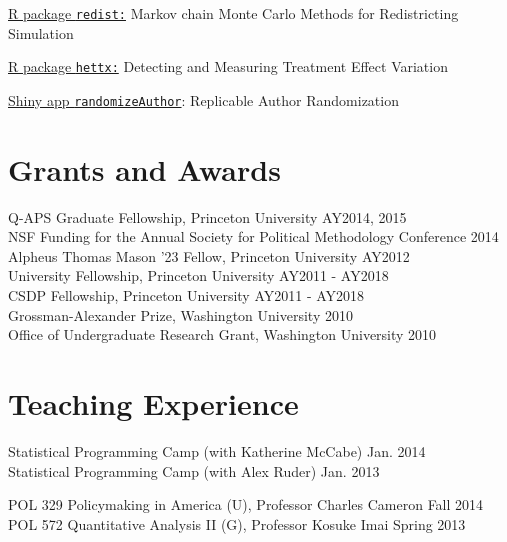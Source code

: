 \documentclass[]{deedy-resume-openfont}
\begin{document}
\href{https://github.com/kosukeimai/redist}{R package \texttt{redist:}} Markov chain Monte Carlo Methods for Redistricting Simulation\\\vspace{2mm}

\href{https://github.com/bfifield/hettx}{R package \texttt{hettx:}} Detecting and Measuring Treatment Effect Variation\\\vspace{2mm}

\href{https://randomizeauthor.shinyapps.io/shiny/}{Shiny app \texttt{randomizeAuthor}}: Replicable Author Randomization
\sectionsep

\section{Grants and Awards}
Q-APS Graduate Fellowship, Princeton University \hfill AY2014, 2015\\
NSF Funding for the Annual Society for Political Methodology Conference \hfill 2014\\
Alpheus Thomas Mason '23 Fellow, Princeton University \hfill AY2012\\
University Fellowship, Princeton University \hfill AY2011 - AY2018\\
CSDP Fellowship, Princeton University \hfill AY2011 - AY2018\\
Grossman-Alexander Prize, Washington University \hfill 2010\\
Office of Undergraduate Research Grant, Washington University \hfill 2010\\
\sectionsep

\section{Teaching Experience}
Statistical Programming Camp (with Katherine McCabe) \hfill Jan. 2014\\
Statistical Programming Camp (with Alex Ruder) \hfill Jan. 2013\\\vspace{2mm}

POL 329 Policymaking in America (U), Professor Charles Cameron \hfill Fall 2014\\
POL 572 Quantitative Analysis II (G), Professor Kosuke Imai \hfill Spring 2013\\
\sectionsep
\end{document}
